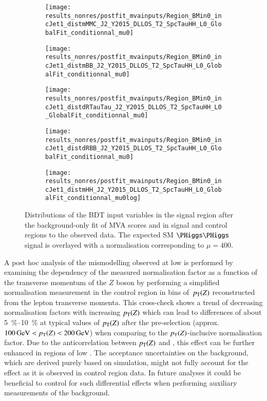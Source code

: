 \begin{figure}[htbp]
  \centering

  \begin{subfigure}{0.46\textwidth}
    \texttt{[image: results\_nonres/postfit\_mvainputs/Region\_BMin0\_incJet1\_distmMMC\_J2\_Y2015\_DLLOS\_T2\_SpcTauHH\_L0\_GlobalFit\_conditionnal\_mu0]}
  \end{subfigure}\hfill%
  \begin{subfigure}{0.46\textwidth}
    \texttt{[image: results\_nonres/postfit\_mvainputs/Region\_BMin0\_incJet1\_distmBB\_J2\_Y2015\_DLLOS\_T2\_SpcTauHH\_L0\_GlobalFit\_conditionnal\_mu0]}
  \end{subfigure}

  \begin{subfigure}{0.46\textwidth}
    \texttt{[image: results\_nonres/postfit\_mvainputs/Region\_BMin0\_incJet1\_distdRTauTau\_J2\_Y2015\_DLLOS\_T2\_SpcTauHH\_L0\_GlobalFit\_conditionnal\_mu0]}
  \end{subfigure}\hfill%
  \begin{subfigure}{0.46\textwidth}
    \texttt{[image: results\_nonres/postfit\_mvainputs/Region\_BMin0\_incJet1\_distdRBB\_J2\_Y2015\_DLLOS\_T2\_SpcTauHH\_L0\_GlobalFit\_conditionnal\_mu0]}
  \end{subfigure}

  \begin{subfigure}{0.46\textwidth}
    \texttt{[image: results\_nonres/postfit\_mvainputs/Region\_BMin0\_incJet1\_distmHH\_J2\_Y2015\_DLLOS\_T2\_SpcTauHH\_L0\_GlobalFit\_conditionnal\_mu0log]}
  \end{subfigure}

  \caption{Distributions of the BDT input variables in the \hadhad
    signal region after the background-only fit of MVA scores and \mll
    in signal and control regions to the observed data. The expected
    SM $\HH$ signal is overlayed with a normalisation corresponding to
    $\mu = 400$.}
  \label{fig:postfit_mva_inputs}
\end{figure}

A post hoc analysis of the mismodelling observed at low \dRtautau is
performed by examining the dependency of the measured \ZHF
normalisation factor as a function of the transverse momentum of the
$Z$ boson by performing a simplified normalisation measurement in the
control region in bins of~$p_{\text{T}}(Z)$ reconstructed from the lepton
transverse momenta. This cross-check shows a trend of decreasing \ZHF
normalisation factors with increasing $p_{\text{T}}(Z)$ which can lead to
differences of about \SIrange{5}{10}{\percent} at typical values of
$p_{\text{T}}(Z)$ after the \hadhad pre-selection (approx.\
$\SI{100}{\GeV} < \pT(Z) < \SI{200}{\GeV}$) when comparing to the
$p_{\text{T}}(Z)$-inclusive normalisation factor. Due to the anticorrelation
between $p_{\text{T}}(Z)$ and \dRtautau, this effect can be further enhanced in
regions of low \dRtautau. The acceptance uncertainties on the \ZHF
background, which are derived purely based on simulation, might not
fully account for the effect as it is observed in control region
data. In future analyses it could be beneficial to control for such
differential effects when performing auxiliary measurements of the
\ZHF background.\todo{Put a plot in appendix?}

